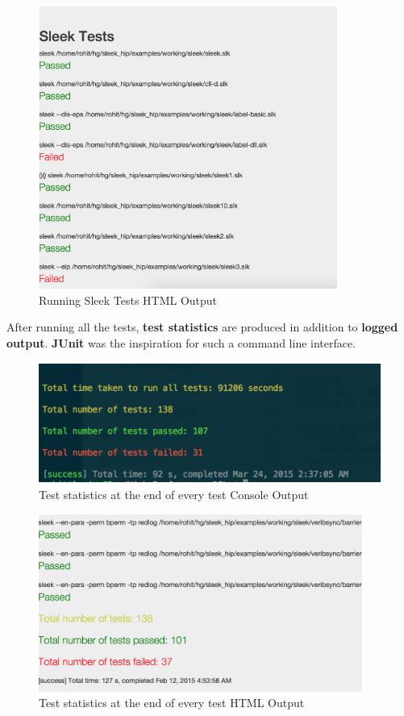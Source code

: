 \begin{figure}[H]
  \centering
    \includegraphics[height=350px]{figures/web_output_1.png}
  \caption{Running Sleek Tests HTML Output}
\end{figure}

\noindent
After running all the tests, \textbf{test statistics} are produced in addition to \textbf{logged output}. \textbf{JUnit} was the inspiration for such a command line interface.

\begin{figure}[H]
  \centering
    \includegraphics[height=150px]{figures/test_statistics.png}
  \caption{Test statistics at the end of every test Console Output}
\end{figure}

\begin{figure}[H]
  \centering
    \includegraphics[height=220px]{figures/web_output_2.png}
  \caption{Test statistics at the end of every test HTML Output}
\end{figure}

